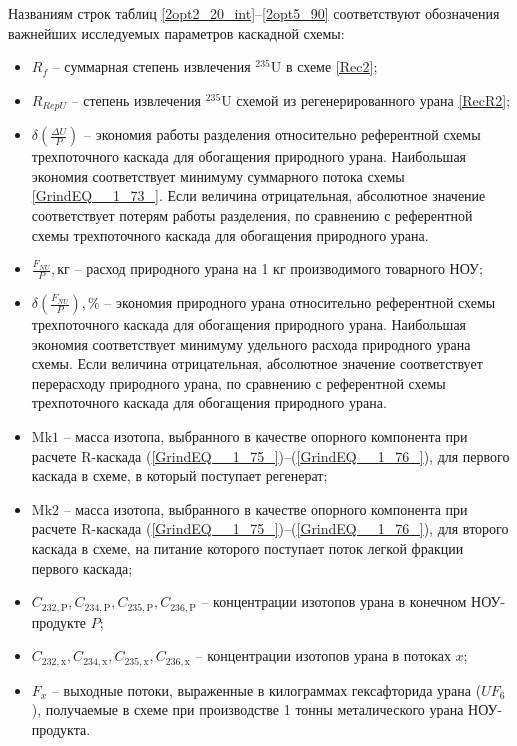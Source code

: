 Названиям строк таблиц \ref{2opt2_20_int}--\ref{2opt5_90} соответствуют обозначения важнейших исследуемых параметров каскадной схемы:

\begin{itemize}
  \item $R_f$ -- суммарная степень извлечения $^{235}$U в схеме \ref{Rec2};
  \item $R_{RepU}$ -- степень извлечения $^{235}$U схемой из регенерированного урана \ref{RecR2};
  \item $\delta(\frac{\Delta U}{P})$ -- экономия работы разделения относительно референтной схемы трехпоточного каскада для обогащения природного урана. Наибольшая экономия соответствует минимуму суммарного потока схемы \ref{GrindEQ__1_73_}. Если величина отрицательная, абсолютное значение соответствует потерям работы разделения, по сравнению с референтной схемы трехпоточного каскада для обогащения природного урана.
  \item  $\frac{F_{NU}}{P}, \text{кг}$ -- расход природного урана на 1 кг производимого товарного НОУ;
  \item  $\delta(\frac{F_{NU}}{P}), \%$ -- экономия природного урана относительно референтной схемы трехпоточного каскада для обогащения природного урана.  Наибольшая экономия соответствует минимуму удельного расхода природного урана схемы. Если величина отрицательная, абсолютное значение соответствует перерасходу природного урана, по сравнению с референтной схемы трехпоточного каскада для обогащения природного урана.
  \item $\text{Mk1}$ -- масса изотопа, выбранного в качестве опорного компонента при расчете R-каскада (\ref{GrindEQ__1_75_})--(\ref{GrindEQ__1_76_}), для первого каскада в схеме, в который поступает регенерат;
  \item $\text{Mk2}$ -- масса изотопа, выбранного в качестве опорного компонента при расчете R-каскада (\ref{GrindEQ__1_75_})--(\ref{GrindEQ__1_76_}), для второго каскада в схеме, на питание которого поступает поток легкой фракции первого каскада;
  \item $C_{232,\text{P}},C_{234,\text{P}},C_{235,\text{P}},C_{236,\text{P}}$ -- концентрации изотопов урана в конечном НОУ-продукте $P$;
  \item $C_{232,\text{x}},C_{234,\text{x}},C_{235,\text{x}},C_{236,\text{x}}$ -- концентрации изотопов урана в потоках $x$;
  \item $F_{x}$ -- выходные потоки, выраженные в килограммах гексафторида урана ($UF_6$), получаемые в схеме при производстве 1 тонны металического урана НОУ-продукта.
\end{itemize}


